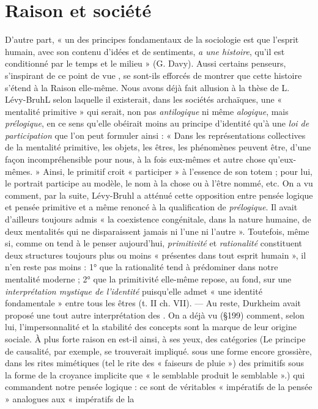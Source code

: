 \section{Raison et société}%
D'autre part, « un des principes fondamentaux de la sociologie est que l’esprit humain, avec son contenu
d’idées et de sentiments, {\it a une histoire}, qu’il est conditionné par le
temps et le milieu » (G. Davy). Aussi certains penseurs, s'inspirant
de ce point de vue , se sont-ils efforcés de montrer que
cette histoire s’étend à la Raison elle-même. Nous avons déjà fait
allusion à la thèse de L. Lévy-BruhL selon laquelle il existerait,
dans les sociétés archaïques, une « mentalité primitive » qui serait,
non pas {\it antilogique} ni même {\it alogique}, mais {\it prélogique}, en ce sens
qu’elle obéirait moins au principe d'identité qu’à une {\it loi de participation} que l’on peut formuler ainsi : « Dans les représentations
collectives de la mentalité primitive, les objets, les êtres, les phénomènes peuvent être, d’une façon incompréhensible pour nous, à la
fois eux-mêmes et autre chose qu’eux-mêmes. » Ainsi, le primitif
croit « participer » à l’essence de son totem ; pour lui, le portrait participe au modèle, le nom à la chose ou à l’être nommé, etc. On a vu
comment, par la suite, Lévy-Bruhl a atténué cette opposition
entre pensée logique et pensée primitive et a même renoncé à la qualification de {\it prélogique}. Il avait d’ailleurs toujours admis « la coexistence congénitale, dans la nature humaine, de deux mentalités qui ne
disparaissent jamais ni l’une ni l’autre ». Toutefois, même si, comme on
tend à le penser aujourd’hui, {\it primitivité} et {\it rationalité} constituent
deux structures toujours plus ou moins « présentes dans tout esprit
humain », il n’en reste pas moins : 1° que la rationalité tend à prédominer dans notre mentalité moderne ; 2° que la primitivité elle-même
repose, au fond, sur une {\it interprétation mystique de l'identité} puisqu’elle
admet « une identité fondamentale » entre tous les êtres (t. II ch. VII).
— Au reste, Durkheim avait proposé une tout autre interprétation des
. On a déjà vu (\S 199) comment, selon
lui, l’impersonnalité et la stabilité des concepts sont la marque de
leur origine sociale. À plus forte raison en est-il ainsi, à ses yeux, des
{\it }catégories {\scriptsize (Le principe de causalité, par exemple, se trouverait impliqué. sous une forme
encore grossière, dans les rites mimétiques (tel le rite des « faiseurs de pluie ») des primitifs sous la forme de la croyance implicite que « le semblable produit le semblable ».)} qui commandent notre pensée logique : ce sont de véritables « impératifs de la pensée » analogues aux « impératifs de la
